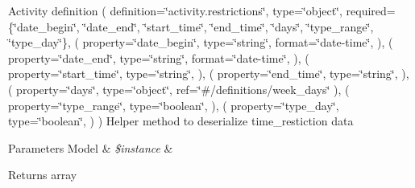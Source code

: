 Activity definition ( definition=\char`\"{}activity.\+restrictions\char`\"{}, type=\char`\"{}object\char`\"{}, required=\{\char`\"{}date\+\_\+begin\char`\"{}, \char`\"{}date\+\_\+end\char`\"{}, \char`\"{}start\+\_\+time\char`\"{}, \char`\"{}end\+\_\+time\char`\"{}, \char`\"{}days\char`\"{}, \char`\"{}type\+\_\+range\char`\"{}, \char`\"{}type\+\_\+day\char`\"{}\}, ( property=\char`\"{}date\+\_\+begin\char`\"{}, type=\char`\"{}string\char`\"{}, format=\char`\"{}date-\/time\char`\"{}, ), ( property=\char`\"{}date\+\_\+end\char`\"{}, type=\char`\"{}string\char`\"{}, format=\char`\"{}date-\/time\char`\"{}, ), ( property=\char`\"{}start\+\_\+time\char`\"{}, type=\char`\"{}string\char`\"{}, ), ( property=\char`\"{}end\+\_\+time\char`\"{}, type=\char`\"{}string\char`\"{}, ), ( property=\char`\"{}days\char`\"{}, type=\char`\"{}object\char`\"{}, ref=\char`\"{}\#/definitions/week\+\_\+days\char`\"{} ), ( property=\char`\"{}type\+\_\+range\char`\"{}, type=\char`\"{}boolean\char`\"{}, ), ( property=\char`\"{}type\+\_\+day\char`\"{}, type=\char`\"{}boolean\char`\"{}, ) ) Helper method to deserialize time\+\_\+restiction data 
\begin{DoxyParams}[1]{Parameters}
Model & {\em \$instance} & \\
\hline
\end{DoxyParams}
\begin{DoxyReturn}{Returns}
array 
\end{DoxyReturn}

